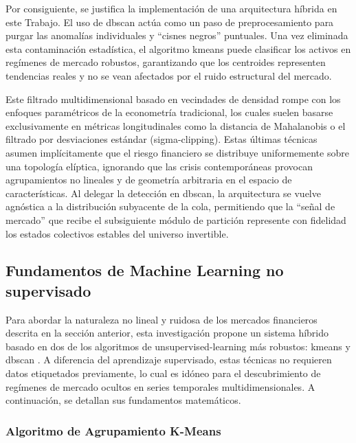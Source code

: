 \documentclass[
]{article}
\begin{document}
	Por consiguiente, se justifica la implementación de una arquitectura
	híbrida en este Trabajo. El uso de \gls{dbscan} actúa como un paso de
	preprocesamiento para purgar las anomalías individuales y ``cisnes
	negros'' puntuales. Una vez eliminada esta contaminación estadística, el
	algoritmo \gls{kmeans} puede clasificar los activos en regímenes de mercado
	robustos, garantizando que los centroides representen tendencias reales
	y no se vean afectados por el ruido estructural del mercado.
	
	Este filtrado multidimensional basado en vecindades de densidad rompe con los enfoques paramétricos de la econometría tradicional, los cuales suelen basarse exclusivamente en métricas longitudinales como la distancia de Mahalanobis o el filtrado por desviaciones estándar (sigma-clipping). Estas últimas técnicas asumen implícitamente que el riesgo financiero se distribuye uniformemente sobre una topología elíptica, ignorando que las crisis contemporáneas provocan agrupamientos no lineales y de geometría arbitraria en el espacio de características. Al delegar la detección en \gls{dbscan}, la arquitectura se vuelve agnóstica a la distribución subyacente de la cola, permitiendo que la ``señal de mercado'' que recibe el subsiguiente módulo de partición represente con fidelidad los estados colectivos estables del universo invertible.
	
	\subsection{Fundamentos de Machine Learning no
		supervisado}\label{fundamentos-de-machine-learning-no-supervisado}
	
	Para abordar la naturaleza no lineal y ruidosa de los mercados
	financieros descrita en la sección anterior, esta investigación propone
	un sistema híbrido basado en dos de los algoritmos de \gls{unsupervised-learning} más robustos: \gls{kmeans} y
	\gls{dbscan} \parencite{bishop2006, hastie2009}. A diferencia del aprendizaje supervisado, estas técnicas no
	requieren datos etiquetados previamente, lo cual es idóneo para el
	descubrimiento de regímenes de mercado ocultos en series temporales
	multidimensionales. A continuación, se detallan sus fundamentos
	matemáticos.
	
	\subsubsection{Algoritmo de Agrupamiento
		K-Means}\label{algoritmo-de-agrupamiento-k-means}
	
\end{document}
